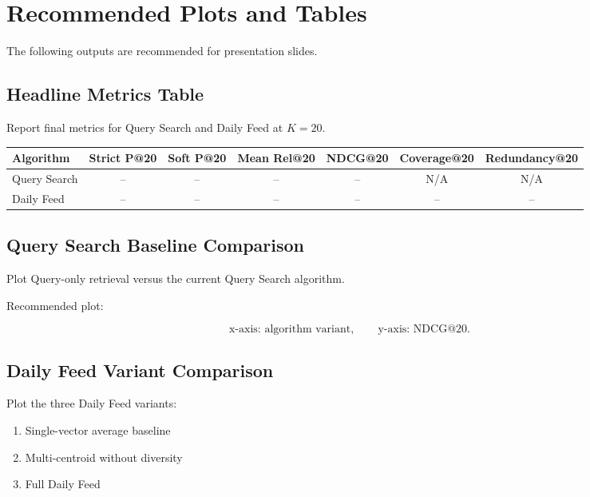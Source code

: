 \documentclass[11pt]{article}
\begin{document}
\section{Recommended Plots and Tables}

The following outputs are recommended for presentation slides.

\subsection{Headline Metrics Table}

Report final metrics for Query Search and Daily Feed at $K=20$.

\begin{center}
\begin{tabular}{lcccccc}
\toprule
\textbf{Algorithm} & \textbf{Strict P@20} & \textbf{Soft P@20} & \textbf{Mean Rel@20} & \textbf{NDCG@20} & \textbf{Coverage@20} & \textbf{Redundancy@20} \\
\midrule
Query Search & -- & -- & -- & -- & N/A & N/A \\
Daily Feed & -- & -- & -- & -- & -- & -- \\
\bottomrule
\end{tabular}
\end{center}

\subsection{Query Search Baseline Comparison}

Plot Query-only retrieval versus the current Query Search algorithm.

Recommended plot:

\[
\text{x-axis: algorithm variant}, \qquad
\text{y-axis: NDCG@20}.
\]

\subsection{Daily Feed Variant Comparison}

Plot the three Daily Feed variants:

\begin{enumerate}[leftmargin=*]
    \item Single-vector average baseline
    \item Multi-centroid without diversity
    \item Full Daily Feed
\end{enumerate}
\end{document}

